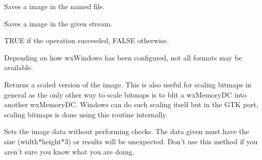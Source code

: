 \label{wximagesavefile}


Saves a image in the named file.


Saves a image in the given stream.






TRUE if the operation succeeded, FALSE otherwise.


Depending on how wxWindows has been configured, not all formats may be available.



\label{wximagescale}


Returns a scaled version of the image. This is also useful for
scaling bitmaps in general as the only other way to scale bitmaps
is to blit a wxMemoryDC into another wxMemoryDC. Windows can do such 
scaling itself but in the GTK port, scaling bitmaps is done using 
this routine internally.

\label{wximagesetdata}


Sets the image data without performing checks. The data given must have 
the size (width*height*3) or results will be unexpected. Don't use this
method if you aren't sure you know what you are doing.

